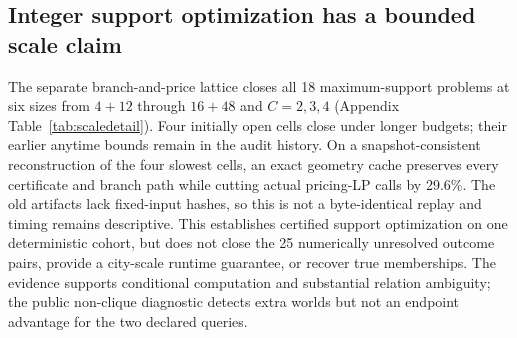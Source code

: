 \subsection{Integer support optimization has a bounded scale claim}
The separate branch-and-price lattice closes all 18 maximum-support problems
at six sizes from $4+12$ through $16+48$ and $C=2,3,4$
(Appendix Table~\ref{tab:scaledetail}). Four initially open cells close under
longer budgets; their earlier anytime bounds remain in the audit history.
On a snapshot-consistent reconstruction of the four slowest cells, an exact
geometry cache preserves every certificate and branch path while cutting
actual pricing-LP calls by 29.6\%. The old artifacts lack fixed-input hashes,
so this is not a byte-identical replay and timing remains descriptive.
This establishes certified support optimization on one deterministic cohort,
but does not close the 25 numerically unresolved outcome pairs, provide a
city-scale runtime guarantee, or recover true memberships. The evidence
supports conditional computation and substantial relation ambiguity; the
public non-clique diagnostic detects extra worlds but not an endpoint advantage
for the two declared queries.
